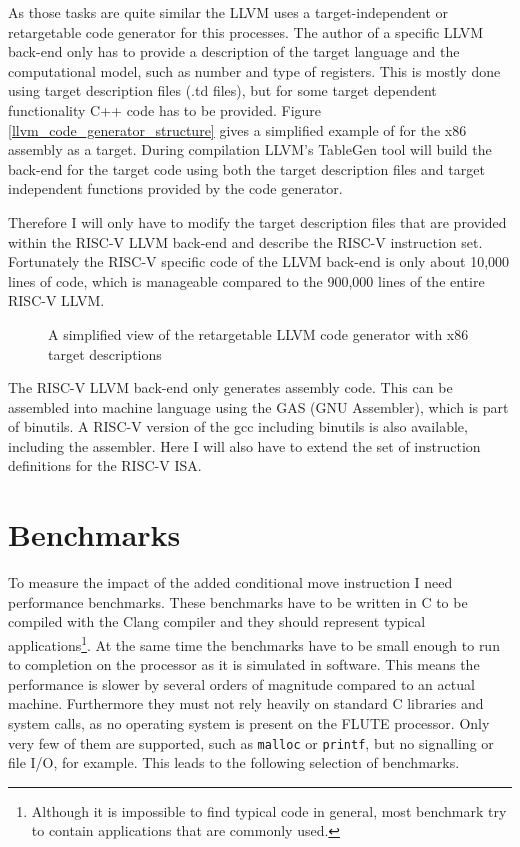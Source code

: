 \documentclass[12pt,twoside,notitlepage]{report}
\begin{document}
As those tasks are quite similar the LLVM uses a target-independent or retargetable code generator for this processes. The author of a specific LLVM back-end only has to provide a description of the target language and the computational model, such as number and type of registers. This is mostly done using target description files (.td files), but for some target dependent functionality C++ code has to be provided. Figure \ref{llvm_code_generator_structure} gives a simplified example of for the x86 assembly as a target. During compilation LLVM's TableGen tool will build the back-end for the target code using both the target description files and target independent functions provided by the code generator.

Therefore I will only have to modify the target description files that are provided within the RISC-V LLVM back-end and describe the RISC-V instruction set. Fortunately the RISC-V specific code of the LLVM back-end is only about 10,000 lines of code, which is manageable compared to the 900,000 lines of the entire RISC-V LLVM.

\begin{figure}[h]
\centering
\caption{A simplified view of the retargetable LLVM code generator with x86 target descriptions}
\end{figure}


The RISC-V LLVM back-end only generates assembly code. This can be assembled into machine language using the GAS (GNU Assembler), which is part of binutils. A RISC-V version of the gcc including binutils is also available, including the assembler\cite{riscvWebsite}. Here I will also have to extend the set of instruction definitions for the RISC-V \gls{ISA}.

\section{Benchmarks}

To measure the impact of the added conditional move instruction I need performance benchmarks. These benchmarks have to be written in C to be compiled with the Clang compiler and they should represent typical applications\footnote{Although it is impossible to find typical code in general, most benchmark try to contain applications that are commonly used.}. At the same time the benchmarks have to be small enough to run to completion on the processor as it is simulated in software. This means the performance is slower by several orders of magnitude compared to an actual machine. Furthermore they must not rely heavily on standard C libraries and system calls, as no operating system is present on the FLUTE processor. Only very few of them are supported, such as \texttt{malloc} or \texttt{printf}, but no signalling or file I/O, for example. This leads to the following selection of benchmarks.
\end{document}
